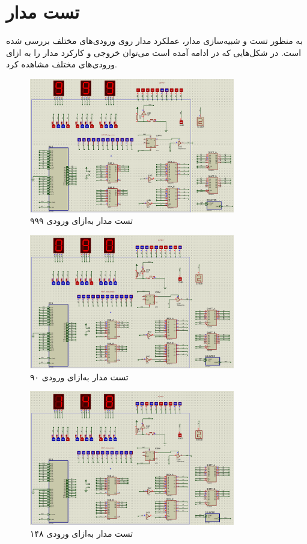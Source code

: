 \documentclass[12pt,onecolumn,a4paper,fleqn]{article}
\begin{document}
	\section{تست مدار}
	به منظور تست و شبیه‌سازی مدار، عملکرد مدار روی ورودی‌های مختلف بررسی شده است. در شکل‌هایی که در ادامه آمده است می‌توان خروجی و کارکرد مدار را به ازای ورودی‌های مختلف مشاهده کرد.
	\begin{figure}[H]
		\centering
		\includegraphics[width=0.8\textwidth]{source/test-999.png}
		\caption{تست مدار به‌ازای ورودی ۹۹۹}
	\end{figure}
	\begin{figure}[H]
		\centering
		\includegraphics[width=0.8\textwidth]{source/test-90.png}
		\caption{تست مدار به‌ازای ورودی ۹۰}
	\end{figure}
	\begin{figure}[H]
		\centering
		\includegraphics[width=0.8\textwidth]{source/test-148.png}
		\caption{تست مدار به‌ازای ورودی ۱۴۸}
	\end{figure}
\end{document}
